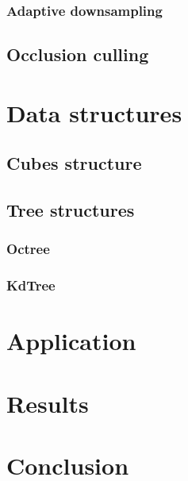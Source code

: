 \documentclass[a4paper,10pt,abstracton,notitlepage]{scrreprt}
\begin{document}
\subsection{Adaptive downsampling}

\section{Occlusion culling}


\chapter{Data structures}

\section{Cubes structure}
\section{Tree structures}
\subsection{Octree}
\subsection{KdTree}

\chapter{Application}

\chapter{Results}

\chapter{Conclusion}



\end{document}
